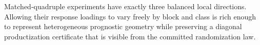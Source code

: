Matched-quadruple experiments have exactly three balanced local directions. Allowing their response loadings to vary freely by block and class is rich enough to represent heterogeneous prognostic geometry while preserving a diagonal productization certificate that is visible from the committed randomization law.